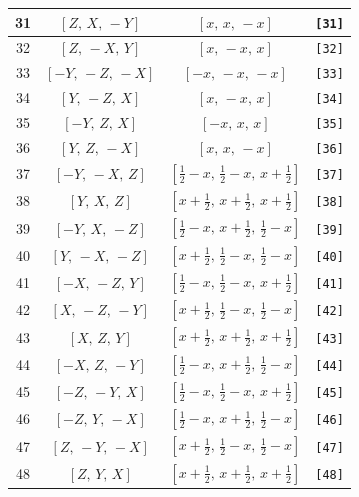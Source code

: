 \documentclass[fleqn,8pt]{jsarticle}
\begin{document}
\begin{longtable}{cccc}
31 & $\left[ Z,\, X,\, - Y \right]$ & $\left[ x,\, x,\, - x \right]$ & {\tt [31]} \\ \hline
32 & $\left[ Z,\, - X,\, Y \right]$ & $\left[ x,\, - x,\, x \right]$ & {\tt [32]} \\ \hline
33 & $\left[ - Y,\, - Z,\, - X \right]$ & $\left[ - x,\, - x,\, - x \right]$ & {\tt [33]} \\ \hline
34 & $\left[ Y,\, - Z,\, X \right]$ & $\left[ x,\, - x,\, x \right]$ & {\tt [34]} \\ \hline
35 & $\left[ - Y,\, Z,\, X \right]$ & $\left[ - x,\, x,\, x \right]$ & {\tt [35]} \\ \hline
36 & $\left[ Y,\, Z,\, - X \right]$ & $\left[ x,\, x,\, - x \right]$ & {\tt [36]} \\ \hline
37 & $\left[ - Y,\, - X,\, Z \right]$ & $\left[ \frac{1}{2} - x,\, \frac{1}{2} - x,\, x + \frac{1}{2} \right]$ & {\tt [37]} \\ \hline
38 & $\left[ Y,\, X,\, Z \right]$ & $\left[ x + \frac{1}{2},\, x + \frac{1}{2},\, x + \frac{1}{2} \right]$ & {\tt [38]} \\ \hline
39 & $\left[ - Y,\, X,\, - Z \right]$ & $\left[ \frac{1}{2} - x,\, x + \frac{1}{2},\, \frac{1}{2} - x \right]$ & {\tt [39]} \\ \hline
40 & $\left[ Y,\, - X,\, - Z \right]$ & $\left[ x + \frac{1}{2},\, \frac{1}{2} - x,\, \frac{1}{2} - x \right]$ & {\tt [40]} \\ \hline
41 & $\left[ - X,\, - Z,\, Y \right]$ & $\left[ \frac{1}{2} - x,\, \frac{1}{2} - x,\, x + \frac{1}{2} \right]$ & {\tt [41]} \\ \hline
42 & $\left[ X,\, - Z,\, - Y \right]$ & $\left[ x + \frac{1}{2},\, \frac{1}{2} - x,\, \frac{1}{2} - x \right]$ & {\tt [42]} \\ \hline
43 & $\left[ X,\, Z,\, Y \right]$ & $\left[ x + \frac{1}{2},\, x + \frac{1}{2},\, x + \frac{1}{2} \right]$ & {\tt [43]} \\ \hline
44 & $\left[ - X,\, Z,\, - Y \right]$ & $\left[ \frac{1}{2} - x,\, x + \frac{1}{2},\, \frac{1}{2} - x \right]$ & {\tt [44]} \\ \hline
45 & $\left[ - Z,\, - Y,\, X \right]$ & $\left[ \frac{1}{2} - x,\, \frac{1}{2} - x,\, x + \frac{1}{2} \right]$ & {\tt [45]} \\ \hline
46 & $\left[ - Z,\, Y,\, - X \right]$ & $\left[ \frac{1}{2} - x,\, x + \frac{1}{2},\, \frac{1}{2} - x \right]$ & {\tt [46]} \\ \hline
47 & $\left[ Z,\, - Y,\, - X \right]$ & $\left[ x + \frac{1}{2},\, \frac{1}{2} - x,\, \frac{1}{2} - x \right]$ & {\tt [47]} \\ \hline
48 & $\left[ Z,\, Y,\, X \right]$ & $\left[ x + \frac{1}{2},\, x + \frac{1}{2},\, x + \frac{1}{2} \right]$ & {\tt [48]} \\
\end{longtable}
\end{document}
